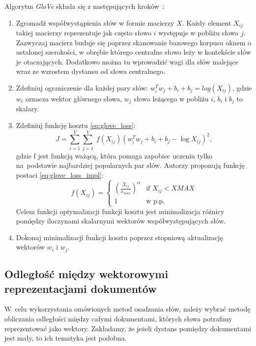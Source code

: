 \documentclass[pl]{minipw} %
\begin{document}
Algorytm \textit{GloVe} składa się z następujących kroków~\cite{glove_cran}:
\begin{enumerate}
	\item Zgromadź współwystąpienia słów w formie macierzy $X$. Każdy element $X_{ij}$ takiej macierzy reprezentuje jak często słowo $i$ występuje w pobliżu słowa $j$. Zazwyczaj macierz buduje się poprzez skanowanie bazowego korpusu oknem o ustalonej szerokości, w obrębie którego centralne słowo leży w kontekście słów je otaczających. Dodatkowo można tu wprowadzić wagi dla słów malejące wraz ze wzrostem dystansu od słowa centralnego.
	\item Zdefiniuj ograniczenie dla każdej pary słów: $w_i^Tw_j + b_i + b_j = log(X_{ij})$, gdzie $w_i$ oznacza wektor głównego słowa, $w_j$ słowa leżącego w pobliżu $i$, $b_i$ i $b_j$ to skalary.
	\item Zdefiniuj funkcję kosztu \ref{eq:glove_loss}:
	\begin{equation}
	\label{eq:glove_loss}
	J = \sum_{i=1}^V \sum_{j=1}^V \; f(X_{ij}) ( w_i^T w_j + b_i + b_j - \log X_{ij})^2,
	\end{equation}
	gdzie f jest funkcją ważącą, która pomaga zapobiec uczeniu tylko na~podstawie najbardziej popularnych par słów. Autorzy proponują funkcję postaci \ref{eq:glove_loss_impl}:
	\begin{equation}
	\label{eq:glove_loss_impl}
	f(X_{ij}) = 
	\begin{cases}
	(\frac{X_{ij}}{x_{max}})^\alpha & \text{if } X_{ij} < XMAX \\
	1 & \text{w p.p.}
	\end{cases}
	\end{equation}
	Celem funkcji optymalizacji funkcji	 kosztu jest minimalizacja różnicy pomiędzy iloczynami skalarnymi wektorów współwystępujących słów.
	\item Dokonaj minimalizacji funkcji kosztu poprzez stopniową aktualizację wektorów $w_i$ i $w_j$.
\end{enumerate}

\subsection{Odległość między wektorowymi reprezentacjami dokumentów}
W~celu wykorzystania omówionych metod osadzania słów, należy wybrać metodę obliczania odległości między całymi dokumentami, których słowa potrafimy reprezentować jako wektory. Zakładamy, że jeżeli dystans pomiędzy dokumentami jest mały, to ich tematyka jest podobna.
\end{document}
